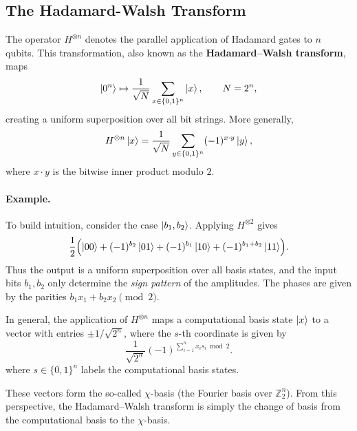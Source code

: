 \subsection{The Hadamard-Walsh Transform}

The operator $H^{\otimes n}$ denotes the parallel application of Hadamard gates to $n$ qubits. This transformation, also known as the
\textbf{Hadamard--Walsh transform}, maps
\[
\ket{0^n} \mapsto
\frac{1}{\sqrt{N}} \sum_{x \in \{0,1\}^n} \ket{x},
\qquad N = 2^n,
\]
creating a uniform superposition over all bit strings.
More generally,
\[
H^{\otimes n}\ket{x}
=
\frac{1}{\sqrt{N}}
\sum_{y \in \{0,1\}^n}
(-1)^{x \cdot y}\ket{y},
\]
where $x \cdot y$ is the bitwise inner product modulo $2$.

\paragraph{Example.}
To build intuition, consider the case $\ket{b_1,b_2}$.
Applying $H^{\otimes 2}$ gives
\[
\frac{1}{2}\Bigl(
\ket{00}
+ (-1)^{b_2}\ket{01}
+ (-1)^{b_1}\ket{10}
+ (-1)^{b_1+b_2}\ket{11}
\Bigr).
\]
Thus the output is a uniform superposition over all basis states, and the
input bits $b_1,b_2$ only determine the \emph{sign pattern} of the
amplitudes. The phases are given by the parities
$b_1x_1 + b_2x_2 \pmod{2}$.

In general, the application of $H^{\otimes n}$ maps a computational basis
state $\ket{x}$ to a vector with entries $\pm 1/\sqrt{2^n}$, where the
$s$-th coordinate is given by
\[
\frac{1}{\sqrt{2^n}}(-1)^{\sum_{i=1}^n x_i s_i \bmod 2}.
\]
where $s \in \{0,1\}^n$ labels the computational basis states.


These vectors form the so-called $\chi$-basis (the Fourier basis over
$\mathbb{Z}_2^n$). From this perspective, the Hadamard--Walsh transform is
simply the change of basis from the computational basis to the $\chi$-basis.
